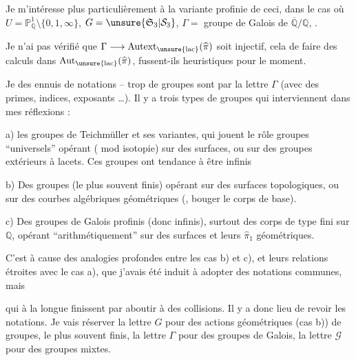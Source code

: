Je m'intéresse plus particulièrement à la variante profinie de ceci, dans le cas où $U=\mathbb P^1_{\mathbb Q}\setminus\{0,1,\infty\}$, $G=\unsure{\mathfrak S_3|\mathcal S_3}$, $\Gamma={}$ groupe de Galois de $\overline{\mathbb Q}/\mathbb Q$,  .

Je n'ai pas vérifié que $\Gamma\longrightarrow\mathrm{Autext}_{\unsure{\mathrm{lac}}}(\widehat\pi)$ soit injectif, cela  de faire des calculs dans $\mathrm{Aut}_{\unsure{\mathrm{lac}}}(\widehat\pi)$, fussent-ils heuristiques pour le moment.



Je   des ennuis de notations -- trop de groupes sont  par la lettre $\Gamma$ (avec  des primes, indices, exposants \ldots). Il y a trois types de groupes qui interviennent dans mes réflexions :

a) les groupes de Teichmüller et ses variantes, qui jouent le rôle  groupes ``universels'' opérant ( mod isotopie) sur des surfaces, ou sur des groupes  extérieurs à lacets. Ces groupes ont tendance à être infinis

b) Des groupes (le plus souvent finis) opérant sur des surfaces topologiques, ou sur des courbes algébriques géométriques (, bouger le corps de base).


c) Des groupes de Galois profinis (donc infinis), surtout des corps de type fini sur $\mathbb Q$, opérant ``arithmétiquement'' sur des surfaces et leurs $\widehat{\pi}_1$ géométriques.

C'est à cause des analogies profondes entre les cas b) et c), et leurs relations étroites avec le cas a), que j'avais été induit à adopter des notations communes, mais



qui à la longue finissent par aboutir à des collisions. Il y a donc lieu de revoir les notations. Je vais réserver la lettre $G$  pour des actions géométriques (cas b)) de groupes, le plus souvent finis, la lettre $\Gamma$  pour des groupes de Galois, la lettre $\mathcal G$ pour des groupes mixtes.


